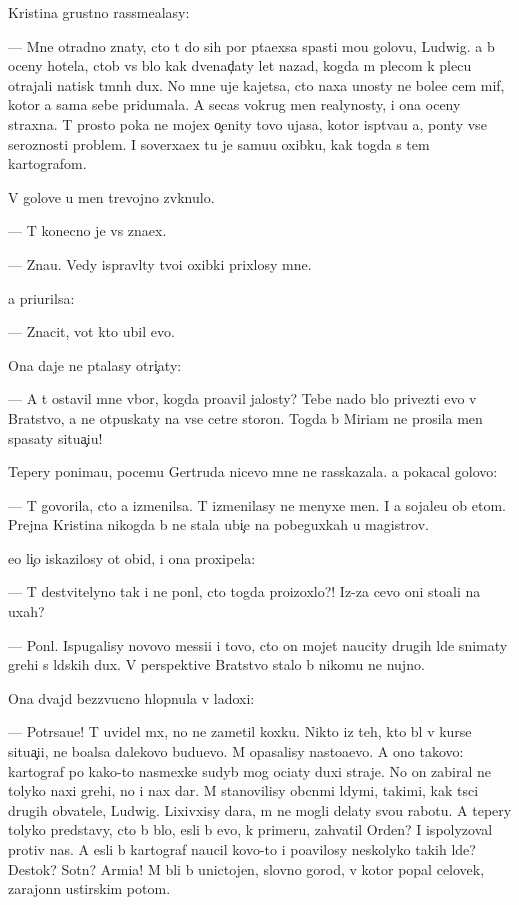 \documentclass[10pt]{book}
\begin{document}
Kristina grustno rassme{\y}alasy:

— Mne otradno znaty, cto t{\yi} do sih por p{\yi}ta{\y}exsa spasti mo{\y}u golovu, Ludwig. {\Y}a b{\yi} oceny hotela, ctob{\yi} vs{\e} b{\yi}lo kak dvenad{\c}aty let nazad, kogda m{\yi} plecom k plecu otrajali natisk t{\e}mn{\yi}h dux. No mne uje kajetsa, cto naxa {\y}unosty ne bole{\y}e cem mif, kotor{\yi}{\y} {\y}a sama sebe pridumala. A se{\y}cas vokrug men{\ia} realynosty, i ona oceny straxna. T{\yi} prosto poka ne mojex o{\c}enity tovo ujasa, kotor{\yi}{\y} isp{\yi}t{\yi}va{\y}u {\y}a, pon{\ia}ty vse{\y} ser{\y}oznosti problem{\yi}. I soverxa{\y}ex tu je samu{\y}u oxibku, kak togda s tem kartografom.

V golove u men{\ia} trevojno zv{\ia}knulo.

— T{\yi} konecno je vs{\e} zna{\y}ex.

— Zna{\y}u. Vedy ispravl{\ia}ty tvo{\y}i oxibki prixlosy mne.

{\Y}a pri{\x}urilsa:

— Znacit, vot kto ubil {\y}evo.

Ona daje ne p{\yi}talasy otri{\c}aty:

— A t{\yi} ostavil mne v{\yi}bor, kogda pro{\y}avil jalosty? Tebe nado b{\yi}lo privezti {\y}evo v Bratstvo, a ne otpuskaty na vse cet{\yi}re storon{\yi}. Togda b{\yi} Miriam ne prosila men{\ia} spasaty situa{\c}i{\y}u!

Tepery ponima{\y}u, pocemu Gertruda nicevo mne ne rasskazala. {\Y}a pokacal golovo{\y}:

— T{\yi} govorila, cto {\y}a izmenilsa. T{\yi} izmenilasy ne menyxe men{\ia}. I {\y}a sojale{\y}u ob etom. Prejn{\ia}{\y}a Kristina nikogda b{\yi} ne stala ubi{\y}{\c}e{\y} na pobeguxkah u magistrov.

{\Y}e{\y}o li{\c}o iskazilosy ot obid{\yi}, i ona proxipela:

— T{\yi} de{\y}stvitelyno tak i ne pon{\ia}l, cto togda proizoxlo?! Iz-za cevo oni sto{\y}ali na uxah?

— Pon{\ia}l. Ispugalisy novovo messi{\y}i i tovo, cto on mojet naucity drugih l{\iu}de{\y} snimaty grehi s l{\iu}dskih dux. V perspektive Bratstvo stalo b{\yi} nikomu ne nujno.

Ona dvajd{\yi} bezzvucno hlopnula v ladoxi:

— Potr{\ia}sa{\y}u{\x}e! T{\yi} uvidel m{\yi}x, no ne zametil koxku. Nikto iz teh, kto b{\yi}l v kurse situa{\c}i{\y}i, ne bo{\y}alsa dalekovo budu{\x}evo. M{\yi} opasalisy nasto{\y}a{\x}evo. A ono takovo: kartograf po kako{\y}-to nasmexke sudyb{\yi} mog oci{\x}aty duxi straje{\y}. No on zabiral ne tolyko naxi grehi, no i nax dar. M{\yi} stanovilisy ob{\yi}cn{\yi}mi l{\iu}dymi, takimi, kak t{\yi}s{\ia}ci drugih ob{\yi}vatele{\y}, Ludwig. Lixivxisy dara, m{\yi} ne mogli delaty svo{\y}u rabotu. A tepery tolyko predstavy, cto b{\yi} b{\yi}lo, {\y}esli b{\yi} {\y}evo, k primeru, zahvatil Orden? I ispolyzoval protiv nas. A {\y}esli b{\yi} kartograf naucil kovo-to i po{\y}avilosy neskolyko takih l{\iu}de{\y}? Des{\ia}tok? Sotn{\ia}? Armi{\y}a! M{\yi} b{\yi}li b{\yi} unictojen{\yi}, slovno gorod, v kotor{\yi}{\y} popal celovek, zarajonn{\yi}{\y} {\y}ustirskim potom.
\end{document}

